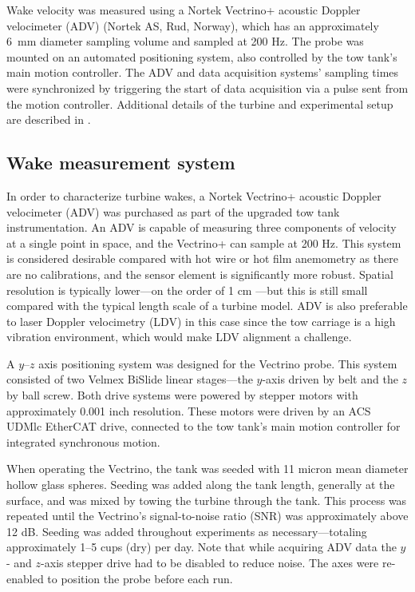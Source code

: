 Wake velocity was measured using a Nortek Vectrino+ acoustic Doppler velocimeter
(ADV) (Nortek AS, Rud, Norway), which has an approximately 6~mm diameter
sampling volume and sampled at 200 Hz. The probe was mounted on an automated
positioning system, also controlled by the tow tank's main motion controller.
The ADV and data acquisition systems' sampling times were synchronized by
triggering the start of data acquisition via a pulse sent from the motion
controller. Additional details of the turbine and experimental setup are
described in \cite{Bachant2015-JoT}.



\subsection{Wake measurement system}

In order to characterize turbine wakes, a Nortek Vectrino+ acoustic Doppler
velocimeter (ADV) was purchased as part of the upgraded tow tank
instrumentation. An ADV is capable of measuring three components of velocity at
a single point in space, and the Vectrino+ can sample at 200 Hz. This system is
considered desirable compared with hot wire or hot film anemometry as there are
no calibrations, and the sensor element is significantly more robust. Spatial
resolution is typically lower---on the order of 1 cm \cite{NortekVectrino}---but
this is still small compared with the typical length scale of a turbine model.
ADV is also preferable to laser Doppler velocimetry (LDV) in this case since the
tow carriage is a high vibration environment, which would make LDV alignment a
challenge.

A $y$--$z$ axis positioning system was designed for the Vectrino probe. This
system consisted of two Velmex BiSlide linear stages---the $y$-axis driven by
belt and the $z$ by ball screw. Both drive systems were powered by stepper
motors with approximately 0.001 inch resolution. These motors were driven by an
ACS UDMlc EtherCAT drive, connected to the tow tank's main motion controller for
integrated synchronous motion.

When operating the Vectrino, the tank was seeded with 11 micron mean diameter
hollow glass spheres. Seeding was added along the tank length, generally at the
surface, and was mixed by towing the turbine through the tank. This process was
repeated until the Vectrino's signal-to-noise ratio (SNR) was approximately
above 12 dB. Seeding was added throughout experiments as necessary---totaling
approximately 1--5 cups (dry) per day. Note that while acquiring ADV data the
$y$- and $z$-axis stepper drive had to be disabled to reduce noise. The axes
were re-enabled to position the probe before each run.


